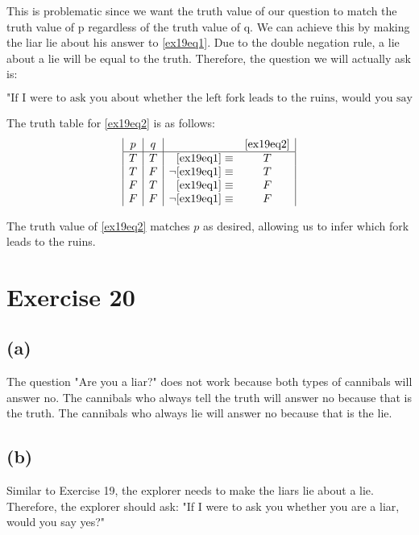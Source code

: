 \documentclass{article}
\begin{document}
This is problematic since we want the truth value of our question to match the truth value of p regardless of the truth value of q. We can achieve this by making the liar lie about his answer to \eqref{ex19eq1}. Due to the double negation rule, a lie about a lie will be equal to the truth.  Therefore, the question we will actually ask is:

\begin{equation}\label{ex19eq2}
	\text{"If I were to ask you about whether the left fork leads to the ruins, would you say yes?"}
\end{equation}

The truth table for \eqref{ex19eq2} is as follows:
\[
	\begin{array}{|c|c|r c|}
		p & q &                             & \eqref{ex19eq2} \\
		\hline
		T & T & \eqref{ex19eq1} \equiv      & T               \\
		T & F & \neg \eqref{ex19eq1} \equiv & T               \\
		F & T & \eqref{ex19eq1} \equiv      & F               \\
		F & F & \neg \eqref{ex19eq1} \equiv & F
	\end{array}
\]

The truth value of \eqref{ex19eq2} matches $p$ as desired, allowing us to infer which fork leads to the ruins.

\pagebreak

\section{Exercise 20}
\subsection{(a)}
The question "Are you a liar?" does not work because both types of cannibals will answer no. The cannibals who always tell the truth will answer no because that is the truth. The cannibals who always lie will answer no because that is the lie.

\subsection{(b)}
Similar to Exercise 19, the explorer needs to make the liars lie about a lie. Therefore, the explorer should ask: "If I were to ask you whether you are a liar, would you say yes?"

\pagebreak
\end{document}
